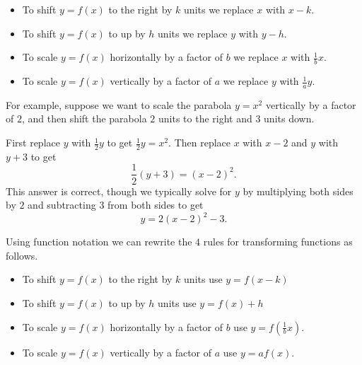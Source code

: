 \documentclass{ximera}
\begin{document}
\begin{itemize}
\item To shift $y=f(x)$ to the right by $k$ units we replace $x$ with $x-k$.
\item To shift $y=f(x)$ to up by $h$ units we replace $y$ with $y-h$.
\item To scale $y=f(x)$ horizontally by a factor of $b$ we replace $x$ with $\frac{1}{b} x$.
\item To scale $y=f(x)$ vertically by a factor of $a$ we replace $y$ with $\frac{1}{a} y$.
\end{itemize}

For example, suppose we want to scale the parabola $y=x^2$ vertically by a factor of $2$, and then shift the parabola $2$ units to the right and $3$ units down.

First replace $y$ with $\frac{1}{2}y$ to get $\frac{1}{2}y=x^2$. Then replace $x$ with $x-2$ and $y$ with $y+3$ to get 
\[\frac{1}{2}(y+3)=(x-2)^2.\] 
This answer is correct, though we typically solve for $y$ by multiplying both sides by $2$ and subtracting $3$ from both sides to get
\[
y=2(x-2)^2-3.
\]

Using function notation we can rewrite the $4$ rules for transforming functions as follows.

\begin{itemize}
\item To shift $y=f(x)$ to the right by $k$ units use $y=f(x-k)$
\item To shift $y=f(x)$ to up by $h$ units use $y=f(x)+h$
\item To scale $y=f(x)$ horizontally by a factor of $b$ use $y=f(\frac{1}{b}x)$.
\item To scale $y=f(x)$ vertically by a factor of $a$ use $y=a f(x)$.
\end{itemize}
\end{document}
